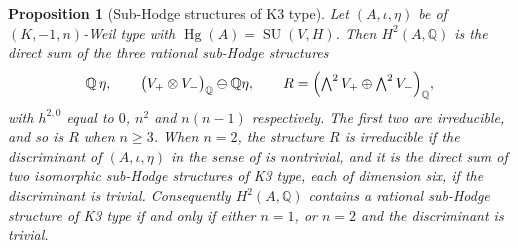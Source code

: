 \documentclass[11pt,reqno]{amsart}
\theoremstyle{plain}
\newtheorem{proposition}[theorem]{Proposition}
\theoremstyle{definition}
\theoremstyle{remark}
\newcommand{\QQ}{\mathbb{Q}}
\DeclareMathOperator{\Hg}{Hg}
\DeclareMathOperator{\SU}{SU}
\begin{document}
\begin{proposition}[Sub-Hodge structures of K3 type]%
\label{prop:normpart}
Let $(A,\iota,\eta)$ be of $(K,-1,n)$-Weil type with $\Hg(A)=\SU(V,H)$. Then
$H^{2}(A,\QQ)$ is the direct sum of the three rational sub-Hodge structures
\[
  \QQ\,\eta,
  \qquad
  \bigl(V_{+}\otimes V_{-}\bigr)_{\QQ}\ominus\QQ\eta,
  \qquad
  R=\Bigl(\textstyle\bigwedge^{2}V_{+}\oplus\bigwedge^{2}V_{-}\Bigr)_{\QQ},
\]
with $h^{2,0}$ equal to $0$, $n^{2}$ and $n(n-1)$ respectively. The first two
are irreducible, and so is $R$ when $n\ge3$. When $n=2$, the structure $R$ is
irreducible if the discriminant of $(A,\iota,\eta)$ in the sense of
 is nontrivial, and it is the direct sum of two isomorphic
sub-Hodge structures of K3 type, each of dimension six, if the discriminant
is trivial. Consequently $H^{2}(A,\QQ)$ contains a rational sub-Hodge
structure of K3 type if and only if either $n=1$, or $n=2$ and the
discriminant is trivial.
\end{proposition}
\end{document}
